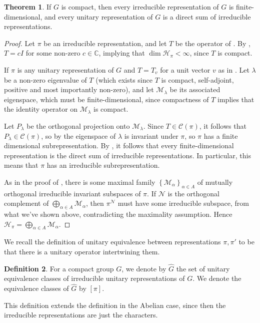 \documentclass[10pt,twoside,openany,final]{memoir}
\theoremstyle{definition}
\newtheorem{theorem}{Theorem}[chapter]
\newtheorem{definition}[theorem]{Definition}
\theoremstyle{Break}
\newcommand{\C}{\mathbb{C}}
\newcommand{\G}{\widehat{G}}
\renewcommand{\H}{\mathcal{H}}
\begin{document}
\begin{theorem}
	If $G$ is compact, then every irreducible representation of $G$ is finite-dimensional, and every unitary representation of $G$ is a direct sum of irreducible representations.
	\label{5.2}
\end{theorem}
\begin{proof}
	Let $\pi$ be an irreducible representation, and let $T$ be the operator of . By , $T=cI$ for some non-zero $c \in \C$, implying that $\dim \H_\pi< \infty$, since $T$ is compact.

	If $\pi$ is any unitary representation of $G$ and $T=T_v$ for a unit vector $v$ as in . Let $\lambda$ be a non-zero eigenvalue of $T$ (which exists since $T$ is compact, self-adjoint, positive and most importantly non-zero), and let $\mathcal{M}_\lambda$ be its associated eigenspace, which must be finite-dimensional, since compactness of $T$ implies that the identity operator on $\mathcal{M}_\lambda$ is compact.

	Let $P_\lambda$ be the orthogonal projection onto $\mathcal{M}_\lambda$. Since $T \in \mathcal{C}(\pi)$, it follows that $P_\lambda \in \mathcal{C}(\pi)$, so by  the eigenspace of $\lambda$ is invariant under $\pi$, so $\pi$ has a finite dimensional subrepresentation. By , it follows that every finite-dimensional representation is the direct sum of irreducible representations. In particular, this means that $\pi$ has an irreducible subrepresentation.

	As in the proof of  , there is some maximal family $\left\{ \mathcal{M}_\alpha \right\}_{\alpha \in A}$ of mutually orthogonal irreducible invariant subspaces of $\pi$. If $\mathcal{N}$ is the orthogonal complement of $\bigoplus_{\alpha \in A }\mathcal{M}_\alpha$, then $\pi^{\mathcal{N}}$ must have some irreducible subspace, from what we've shown above, contradicting the maximality assumption. Hence $\H_\pi = \bigoplus_{\alpha \in A } \mathcal{M}_\alpha$.
\end{proof}

We recall the definition of unitary equivalence between representations $\pi,\pi'$ to be that there is a unitary operator intertwining them. 
\begin{definition}
	For a compact group $G$, we denote by $\G$ the set of unitary equivalence classes of irreducible unitary representations of $G$. We denote the equivalence classes of $\G$ by $[\pi]$. 
\end{definition}
This definition extends the definition in the Abelian case, since then the irreducible representations are just the characters.
\end{document}
